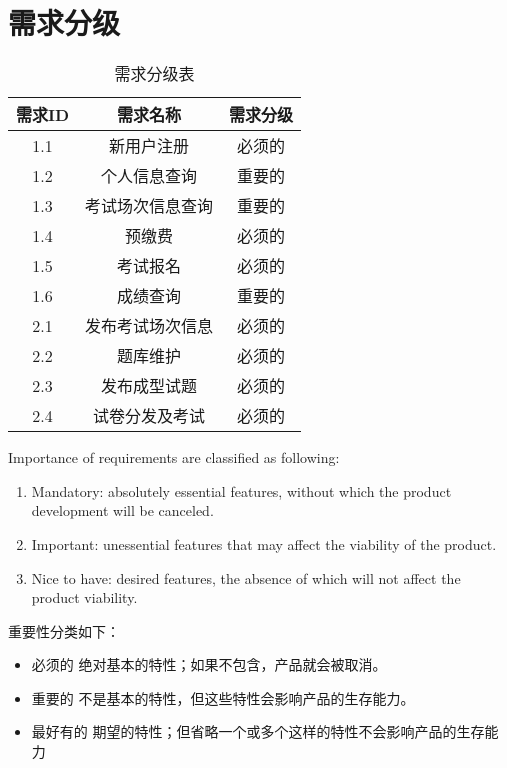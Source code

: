 \chapter{需求分级}
\begin{table}[htbp]
\centering
\caption{需求分级表} \label{tab:classification}
\begin{tabular}{|c|c|c|}
    \hline
    需求ID & 需求名称 & 需求分级 \\
    \hline
    1.1 & 新用户注册 & 必须的 \\
    \hline
    1.2 & 个人信息查询 & 重要的 \\
    \hline
    1.3 & 考试场次信息查询 & 重要的 \\
    \hline
    1.4 & 预缴费 & 必须的 \\
    \hline
    1.5 & 考试报名 & 必须的 \\
    \hline
    1.6 & 成绩查询 & 重要的 \\
    \hline
    2.1 & 发布考试场次信息 & 必须的 \\
    \hline
    2.2 & 题库维护 & 必须的 \\
    \hline
    2.3 & 发布成型试题 & 必须的 \\
    \hline
    2.4 & 试卷分发及考试 &  必须的 \\
    \hline

\end{tabular}
\end{table}

Importance of requirements are classified as following:
\begin{enumerate}
\item Mandatory: absolutely essential features, without which the product development will be canceled.
\item Important: unessential features that may affect the viability of the product.
\item Nice to have: desired features, the absence of which will not affect the product viability.
\end{enumerate}

重要性分类如下：
\begin{itemize}
\item 必须的		绝对基本的特性；如果不包含，产品就会被取消。
\item 重要的		不是基本的特性，但这些特性会影响产品的生存能力。
\item 最好有的		期望的特性；但省略一个或多个这样的特性不会影响产品的生存能力
\end{itemize}
